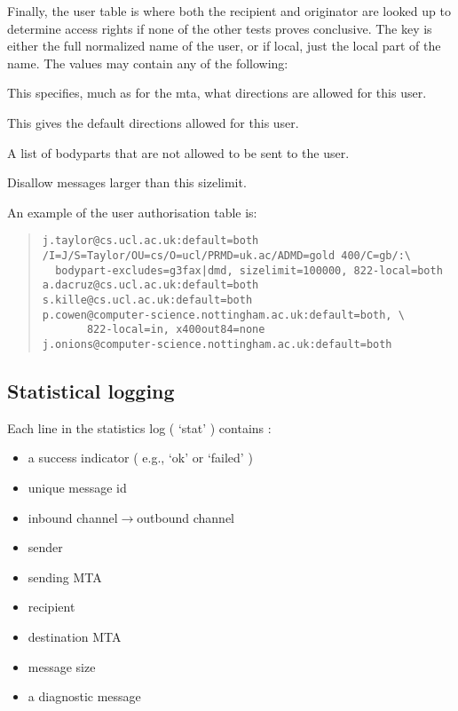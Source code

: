 Finally, the user table is where both the recipient and originator are
looked up to determine access rights if none of the other tests proves
conclusive. The key is either the full normalized name of the user, or
if local, just the local part of the name.
The values may contain any of the following:
\begin{describe}
\item[\verb|<channel>=<direction>|:]
This specifies, much as for the mta, what directions are allowed for
this user.

\item[\verb|default=<direction>|:]
This gives the default directions allowed for this user.

\item[\verb|bodypart-excludes=<bodyparts>|:]
A list of bodyparts that are not allowed to be sent to the user.

\item[\verb|sizelimit=<digits>|:]
Disallow messages larger than this sizelimit.

\end{describe}

An example of the user authorisation table is:
\begin{quote}\small\begin{verbatim}
j.taylor@cs.ucl.ac.uk:default=both
/I=J/S=Taylor/OU=cs/O=ucl/PRMD=uk.ac/ADMD=gold 400/C=gb/:\
  bodypart-excludes=g3fax|dmd, sizelimit=100000, 822-local=both
a.dacruz@cs.ucl.ac.uk:default=both
s.kille@cs.ucl.ac.uk:default=both
p.cowen@computer-science.nottingham.ac.uk:default=both, \
       822-local=in, x400out84=none
j.onions@computer-science.nottingham.ac.uk:default=both
\end{verbatim}\end{quote}

\subsection{Statistical logging}

Each line in the statistics log ( `stat' ) contains :
\begin{itemize}
\item	a success indicator ( e.g., `ok' or `failed' )
\item	unique message id
\item	inbound channel$\rightarrow$outbound channel
\item	sender
\item	sending MTA
\item	recipient
\item	destination MTA
\item	message size
\item	a diagnostic message
\end{itemize}

